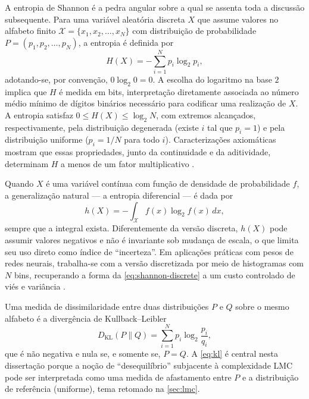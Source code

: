 A entropia de Shannon \cite{shannon1948} é a pedra angular sobre a
qual se assenta toda a discussão subsequente. Para uma variável
aleatória discreta $X$ que assume valores no alfabeto finito
$\mathcal{X} = \{x_1, x_2, \ldots, x_N\}$ com distribuição de
probabilidade $P = (p_1, p_2, \ldots, p_N)$, a entropia é definida por
\begin{equation}
  H(X) = -\sum_{i=1}^{N} p_i \log_2 p_i,
  \label{eq:shannon-discrete}
\end{equation}
adotando-se, por convenção, $0 \log_2 0 = 0$. A escolha do logaritmo
na base $2$ implica que $H$ é medida em bits, interpretação
diretamente associada ao número médio mínimo de dígitos binários
necessário para codificar uma realização de $X$. A entropia satisfaz
$0 \le H(X) \le \log_2 N$, com extremos alcançados, respectivamente,
pela distribuição degenerada (existe $i$ tal que $p_i = 1$) e pela
distribuição uniforme ($p_i = 1/N$ para todo $i$). Caracterizações
axiomáticas mostram que essas propriedades, junto da continuidade e da
aditividade, determinam $H$ a menos de um fator multiplicativo
\cite{coverthomas2006}.

Quando $X$ é uma variável contínua com função de densidade de
probabilidade $f$, a generalização natural --- a entropia diferencial
--- é dada por
\begin{equation}
  h(X) = -\int_{\mathcal{X}} f(x) \log_2 f(x)\, dx,
  \label{eq:shannon-diff}
\end{equation}
sempre que a integral exista. Diferentemente da versão discreta,
$h(X)$ pode assumir valores negativos e não é invariante sob mudança
de escala, o que limita seu uso direto como índice de
``incerteza''. Em aplicações práticas com pesos de redes neurais,
trabalha-se com a versão discretizada por meio de histogramas com $N$
bins, recuperando a forma da \autoref{eq:shannon-discrete} a um custo
controlado de viés e variância \cite{coverthomas2006}.

Uma medida de dissimilaridade entre duas distribuições $P$ e $Q$
sobre o mesmo alfabeto é a divergência de Kullback--Leibler
\begin{equation}
  D_{\mathrm{KL}}(P\|Q) = \sum_{i=1}^{N} p_i \log_2 \frac{p_i}{q_i},
  \label{eq:kl}
\end{equation}
que é não negativa e nula se, e somente se, $P = Q$. A
\autoref{eq:kl} é central nesta dissertação porque a noção de
``desequilíbrio'' subjacente à complexidade LMC pode ser interpretada
como uma medida de afastamento entre $P$ e a distribuição de
referência (uniforme), tema retomado na \autoref{sec:lmc}.

